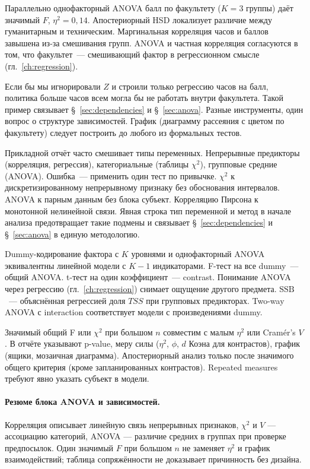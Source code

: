 Параллельно однофакторный ANOVA балл по факультету ($K=3$ группы) даёт значимый $F$, $\eta^2=0{,}14$.
Апостериорный HSD локализует различие между гуманитарным и техническим.
Маргинальная корреляция часов и баллов завышена из-за смешивания групп. ANOVA и частная корреляция согласуются в том, что факультет~--- смешивающий фактор в регрессионном смысле (гл.~\ref{ch:regression}).

Если бы мы игнорировали $Z$ и строили только регрессию часов на балл, политика больше часов всем могла бы не работать внутри факультета.
Такой пример связывает \S~\ref{sec:dependencies} и \S~\ref{sec:anova}. Разные инструменты, один вопрос о структуре зависимостей.
График (диаграмму рассеяния с цветом по факультету) следует построить до любого из формальных тестов.

Прикладной отчёт часто смешивает типы переменных. Непрерывные предикторы (корреляция, регрессия), категориальные (таблицы $\chi^2$), групповые средние (ANOVA).
Ошибка~--- применить один тест по привычке. $\chi^2$ к дискретизированному непрерывному признаку без обоснования интервалов. ANOVA к парным данным без блока субъект. Корреляцию Пирсона к монотонной нелинейной связи.
Явная строка тип переменной и метод в начале анализа предотвращает такие подмены и связывает \S~\ref{sec:dependencies} и \S~\ref{sec:anova} в единую методологию.

Dummy-кодирование фактора с $K$ уровнями и однофакторный ANOVA эквивалентны линейной модели с $K-1$ индикаторами.
F-тест на все dummy~--- общий ANOVA. t-тест на один коэффициент~--- contrast.
Понимание ANOVA через регрессию (гл.~\ref{ch:regression}) снимает ощущение другого предмета. $\mathrm{SSB}$~--- объяснённая регрессией доля $TSS$ при групповых предикторах.
Two-way ANOVA с interaction соответствует модели с произведениями dummy.

Значимый общий F или $\chi^2$ при большом $n$ совместим с малым $\eta^2$ или Cramér's $V$.
В отчёте указывают p-value, меру силы ($\eta^2$, $\phi$, $d$ Коэна для контрастов), график (ящики, мозаичная диаграмма).
Апостериорный анализ только после значимого общего критерия (кроме запланированных контрастов).
Repeated measures требуют явно указать субъект в модели.

\paragraph{Резюме блока ANOVA и зависимостей.}
Корреляция описывает линейную связь непрерывных признаков, $\chi^2$ и $V$ --- ассоциацию категорий, ANOVA --- различие средних в группах при проверке предпосылок.
Один значимый $F$ при большом $n$ не заменяет $\eta^2$ и график взаимодействий; таблица сопряжённости не доказывает причинность без дизайна.


